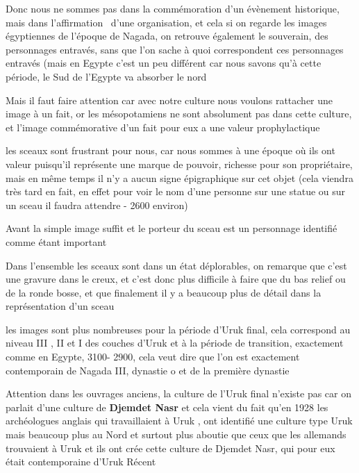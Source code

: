\documentclass[a4paper]{article}
\begin{document}
{
\newline
Donc nous ne sommes pas dans la commémoration d'un évènement historique, mais dans l'affirmation \ d'une organisation,
et cela si on regarde les images égyptiennes de l'époque de Nagada, on retrouve également le souverain, des personnages
entravés, sans que l'on sache à quoi correspondent ces personnages entravés (mais en Egypte c'est un peu différent car
nous savons qu'à cette période, le Sud de l'Egypte va absorber le nord}


\bigskip

{
Mais il faut faire attention car avec notre culture nous voulons rattacher une image à un fait, or les mésopotamiens ne
sont absolument pas dans cette culture, et l'image commémorative d'un fait pour eux a une valeur prophylactique}


\bigskip

{
les sceaux sont frustrant pour nous, car nous sommes à une époque où ils ont valeur puisqu'il représente une marque de
pouvoir, richesse pour son propriétaire, mais en même temps il n'y a aucun signe épigraphique sur cet objet (cela
viendra très tard en fait, en effet pour voir le nom d'une personne sur une statue ou sur un sceau il faudra attendre -
2600 environ)}


\bigskip

{
Avant la simple image suffit et le porteur du sceau est un personnage identifié comme étant important}


\bigskip

{
Dans l'ensemble les sceaux sont dans un état déplorables, on remarque que c'est une gravure dans le creux, et c'est donc
plus difficile à faire que du bas relief ou de la ronde bosse, et que finalement il y a beaucoup plus de détail dans la
représentation d'un sceau}


\bigskip

{
les images sont plus nombreuses pour la période d'Uruk final, cela correspond au niveau III , II et I des couches d'Uruk
et à la période de transition, exactement comme en Egypte, 3100- 2900, cela veut dire que l'on est exactement
contemporain de Nagada III, dynastie o et de la première dynastie}


\bigskip

{
Attention dans les ouvrages anciens, la culture de l'Uruk final n'existe pas car on parlait d'une culture de
\textbf{Djemdet Nasr} et cela vient du fait qu'en 1928 les archéologues anglais qui travaillaient à Uruk , ont
identifié une culture type Uruk mais beaucoup plus au Nord et surtout plus aboutie que ceux que les allemands
trouvaient à Uruk et ils ont crée cette culture de Djemdet Nasr, qui pour eux était contemporaine d'Uruk Récent}
\end{document}
